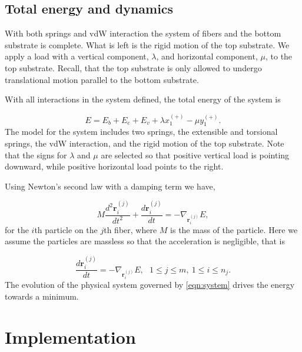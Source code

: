 
\subsection{Total energy and dynamics}

With both springs and vdW interaction the system of fibers and the bottom substrate is complete. What is left is the rigid motion of the top substrate. We apply a load with a vertical component, $\lambda$, and horizontal component, $\mu$, to the top substrate. Recall, that the top substrate is only allowed to undergo translational motion parallel to the bottom substrate.

With all interactions in the system defined, the total energy of the system is

\begin{equation}
	E = E_b + E_e + E_v + \lambda x_1^{(+)} - \mu y_1^{(+)}.
\end{equation}
The model for the system includes two springs, the extensible and torsional springs, the vdW interaction, and the rigid motion of the top substrate. Note that the signs for $\lambda$ and $\mu$ are selected so that positive vertical load is pointing downward, while positive horizontal load points to the right.

Using Newton's second law with a damping term we have,

\begin{equation}
	M\frac{d^2\textbf{r}_i^{(j)}}{dt^2} + \frac{d\textbf{r}_i^{(j)}}{dt} = -\nabla_{\textbf{r}_i^{(j)}}E,
\end{equation}
for the $i$th particle on the $j$th fiber, where $M$ is the mass of the particle. Here we assume the particles are massless so that the acceleration is negligible, that is

\begin{equation} \label{eqn:system}
	 \frac{d\textbf{r}_i^{(j)}}{dt} = -\nabla_{\textbf{r}_i^{(j)}}E,\ \ \ 1 \leq j \leq m,\  1 \leq i \leq n_j.
\end{equation}
The evolution of the physical system governed by \eqref{eqn:system} drives the energy towards a minimum.

\section{Implementation}

